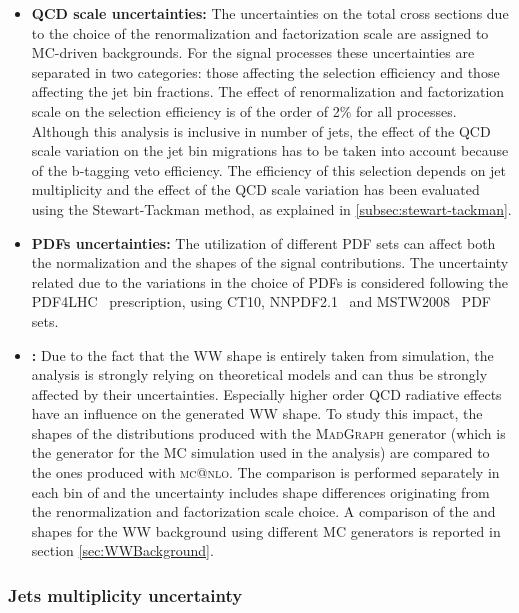 \begin{itemize}

\item {\bf QCD scale uncertainties:}
  The uncertainties on the total cross sections due to the choice of the renormalization and factorization scale are assigned to MC-driven backgrounds.
  For the signal processes these uncertainties are separated in two categories: those affecting the selection efficiency and those affecting the jet bin fractions.
  The effect of renormalization and factorization scale on the selection efficiency is of the order of 2\% for all processes.
  Although this analysis is inclusive in number of jets, the effect of the QCD scale variation on the jet bin migrations has to be taken into account because of the b-tagging veto efficiency. The efficiency of this selection depends on jet multiplicity and the effect of the QCD scale variation has been evaluated using the Stewart-Tackman method, as explained in \ref{subsec:stewart-tackman}.

\item {\bf PDFs uncertainties:} 
  The utilization of different PDF sets can affect both the normalization and the shapes of the signal contributions. The uncertainty related due to the variations in the choice of PDFs is considered following the PDF4LHC~\cite{Alekhin:2011sk,Botje:2011sn} prescription, using CT10, NNPDF2.1~\cite{Ball:2011mu} and MSTW2008~\cite{Martin:2009iq} PDF sets.


\item {\bf {}:} 
  Due to the fact that the WW shape is entirely taken from simulation, the analysis is strongly
  relying on theoretical models and can thus be strongly affected by their uncertainties. Especially higher order QCD radiative effects have an influence on the generated WW shape. To study this impact, the shapes of the distributions produced with the \textsc{MadGraph} generator (which is the generator for the MC simulation used in the analysis) are compared to the ones produced with \textsc{mc@nlo}. The comparison is performed separately in each bin of \pth and the uncertainty includes shape differences originating from the renormalization and factorization scale choice. A comparison of the \mll and \mt shapes for the WW background using different MC generators is reported in section \ref{sec:WWBackground}.
\end{itemize} 

\subsubsection{Jets multiplicity uncertainty \label{subsec:stewart-tackman}}

